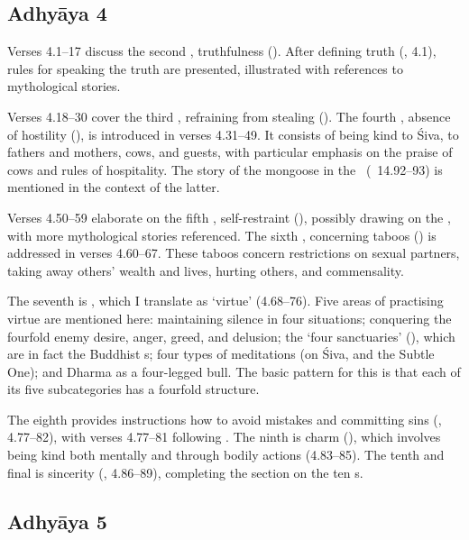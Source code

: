 \subsection{Adhyāya 4}\label{contents_of_ch04}
Verses 4.1--17 discuss the second , truthfulness (). 
After defining truth (, 4.1), rules for speaking the truth are presented,
illustrated with references to mythological stories. 

Verses 4.18--30 cover the third 
, refraining from stealing (). 
The fourth , absence of hostility (), is 
introduced in verses 4.31--49. It consists of being kind to Śiva, 
to fathers and mothers, cows, and guests,
with particular emphasis on the praise of cows and rules of hospitality.  
The story of the mongoose in the \MBH\ (\MBH\ 14.92--93)
is mentioned in the context of the latter.

Verses 4.50--59 elaborate on the fifth ,
self-restraint (), possibly drawing on the 
\Buddhacarita,  with more mythological stories referenced.
The sixth , concerning taboos () is addressed in verses 4.60--67.
These taboos concern restrictions on sexual partners, taking away others' wealth and
lives, hurting others, and commensality.

The seventh  is , which I translate as `virtue' (4.68--76).
Five areas of practising virtue are mentioned here: 
maintaining silence in four situations;
conquering the fourfold enemy desire, anger, greed, and delusion;
the `four sanctuaries' (), which are in fact the
Buddhist s; four types of meditations (on 
Śiva, and the Subtle One); and Dharma as a four-legged bull. The
basic pattern for this  is that each of its five subcategories
has a fourfold structure.

The eighth  provides instructions how to avoid mistakes and committing sins
(, 4.77--82), with verses 4.77--81 following \Manu.
The ninth  is charm (), which involves being kind both mentally
and through bodily actions (4.83--85). 
The tenth and final  is sincerity (, 4.86--89),
completing the section on the ten s.



\subsection{Adhyāya 5}\label{contents_of_ch05}

